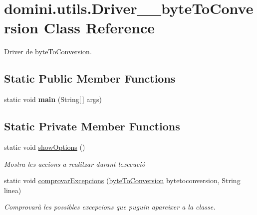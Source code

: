 \hypertarget{classdomini_1_1utils_1_1Driver____byteToConversion}{}\section{domini.\+utils.\+Driver\+\_\+\+\_\+byte\+To\+Conversion Class Reference}
\label{classdomini_1_1utils_1_1Driver____byteToConversion}


Driver de \hyperlink{classdomini_1_1utils_1_1byteToConversion}{byte\+To\+Conversion}.  


\subsection*{Static Public Member Functions}
\begin{DoxyCompactItemize}
\item 
\mbox{\label{classdomini_1_1utils_1_1Driver____byteToConversion_a19510acac17ad211538d878b4de039b8}} 
static void {\bfseries main} (String\mbox{[}$\,$\mbox{]} args)
\end{DoxyCompactItemize}
\subsection*{Static Private Member Functions}
\begin{DoxyCompactItemize}
\item 
\mbox{\label{classdomini_1_1utils_1_1Driver____byteToConversion_a58412c0a63cc729003ca6d28bbc3b83b}} 
static void \hyperlink{classdomini_1_1utils_1_1Driver____byteToConversion_a58412c0a63cc729003ca6d28bbc3b83b}{show\+Options} ()
\begin{DoxyCompactList}\small\item\em Mostra les accions a realitzar durant l\textquotesingle{}execució \end{DoxyCompactList}\item 
static void \hyperlink{classdomini_1_1utils_1_1Driver____byteToConversion_a82c589da57bedb139b9254c8623a7fd4}{comprovar\+Excepcions} (\hyperlink{classdomini_1_1utils_1_1byteToConversion}{byte\+To\+Conversion} bytetoconversion, String linea)
\begin{DoxyCompactList}\small\item\em Comprovarà les possibles excepcions que puguin apareixer a la classe. \end{DoxyCompactList}\end{DoxyCompactItemize}


